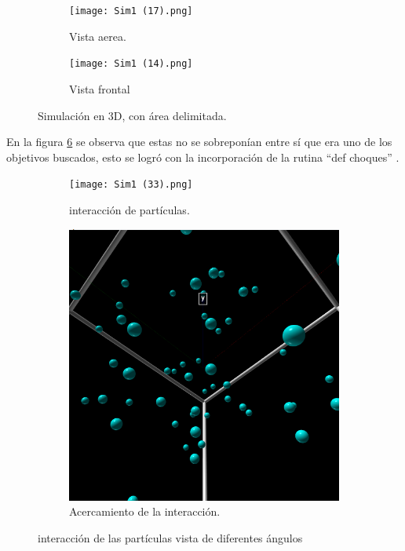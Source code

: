 \documentclass[3pt,twocolumn]{elsarticle}
\begin{document}
\begin{figure}[h!]
\centering
\begin{subfigure}[b]{0.65\linewidth}
\texttt{[image: Sim1 (17).png]}
\caption{Vista aerea.}
\label{f1.1}
\end{subfigure}
\begin{subfigure}[b]{0.65\linewidth}
\texttt{[image: Sim1 (14).png]}
\caption{Vista frontal}
\label{f1.2}
\end{subfigure}
\caption{Simulación en 3D, con área delimitada.}
\label{f1}
\end{figure}


En la figura \ref{f2} se observa que estas no se sobreponían entre sí que era uno de los objetivos buscados, esto se logró con la incorporación de la rutina “def choques” \cite{ana}.

\begin{figure}[h!]
\centering
\begin{subfigure}[b]{0.65\linewidth}
\texttt{[image: Sim1 (33).png]}
\caption{interacción de partículas.}
\label{f2.1}
\end{subfigure}
\begin{subfigure}[b]{0.65\linewidth}
\includegraphics[width=\linewidth]{Sim1 (34).png}
\caption{Acercamiento de la interacción.}
\label{f2.2}
\end{subfigure}
\caption{interacción de las partículas vista de diferentes ángulos}
\label{f2}
\end{figure}
\end{document}
